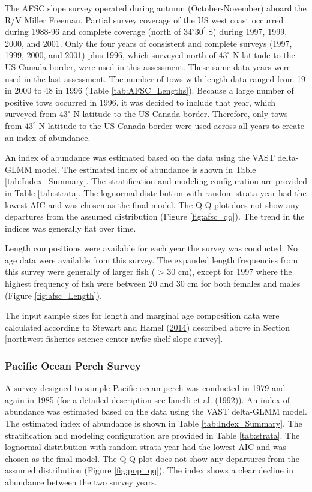 \documentclass[12pt,]{article}
\begin{document}
The AFSC slope survey operated during autumn (October-November) aboard
the R/V Miller Freeman. Partial survey coverage of the US west coast
occurred during 1988-96 and complete coverage (north of
\(34^\circ 30^\prime\) S) during 1997, 1999, 2000, and 2001. Only the
four years of consistent and complete surveys (1997, 1999, 2000, and
2001) plus 1996, which surveyed north of \(43^\circ\) N latitude to the
US-Canada border, were used in this assessment. These same data years
were used in the last assessment. The number of tows with length data
ranged from 19 in 2000 to 48 in 1996 (Table \ref{tab:AFSC_Lengths}).
Because a large number of positive tows occurred in 1996, it was decided
to include that year, which surveyed from \(43^\circ\) N latitude to the
US-Canada border. Therefore, only tows from \(43^\circ\) N latitude to
the US-Canada border were used across all years to create an index of
abundance.

An index of abundance was estimated based on the data using the VAST
delta-GLMM model. The estimated index of abundance is shown in Table
\ref{tab:Index_Summary}. The stratification and modeling configuration
are provided in Table \ref{tab:strata}. The lognormal distribution with
random strata-year had the lowest AIC and was chosen as the final model.
The Q-Q plot does not show any departures from the assumed distribution
(Figure \ref{fig:afsc_qq}). The trend in the indices was generally flat
over time.

Length compositions were available for each year the survey was
conducted. No age data were available from this survey. The expanded
length frequencies from this survey were generally of larger fish (
\textgreater{} 30 cm), except for 1997 where the highest frequency of
fish were between 20 and 30 cm for both females and males (Figure
\ref{fig:afsc_Length}).

The input sample sizes for length and marginal age composition data were
calculated according to Stewart and Hamel
(\protect\hyperlink{ref-stewart_bootstrapping_2014}{2014}) described
above in Section
\ref{northwest-fisheries-science-center-nwfsc-shelf-slope-survey}.

\subsubsection{Pacific Ocean Perch
Survey}\label{pacific-ocean-perch-survey}

A survey designed to sample Pacific ocean perch was conducted in 1979
and again in 1985 (for a detailed description see Ianelli et al.
(\protect\hyperlink{ref-ianelli_status_1992}{1992})). An index of
abundance was estimated based on the data using the VAST delta-GLMM
model. The estimated index of abundance is shown in Table
\ref{tab:Index_Summary}. The stratification and modeling configuration
are provided in Table \ref{tab:strata}. The lognormal distribution with
random strata-year had the lowest AIC and was chosen as the final model.
The Q-Q plot does not show any departures from the assumed distribution
(Figure \ref{fig:pop_qq}). The index shows a clear decline in abundance
between the two survey years.
\end{document}
